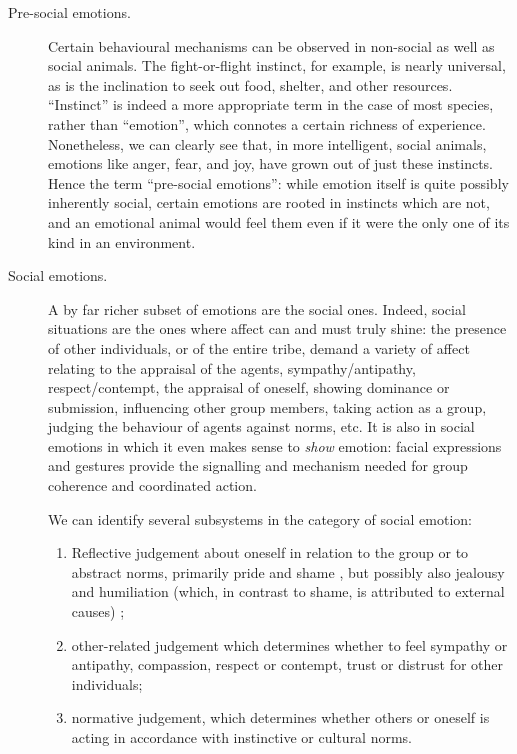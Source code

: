 \begin{description}
	\item[Pre-social emotions.] Certain behavioural mechanisms can be observed in non-social as well as social animals. The fight-or-flight instinct, for example, is nearly universal, as is the inclination to seek out food, shelter, and other resources. ``Instinct'' is indeed a more appropriate term in the case of most species, rather than ``emotion'', which connotes a certain richness of experience. Nonetheless, we can clearly see that, in more intelligent, social animals, emotions like anger, fear, and joy, have grown out of just these instincts. Hence the term ``pre-social emotions'': while emotion itself is quite possibly inherently social, certain emotions are rooted in instincts which are not, and an emotional animal would feel them even if it were the only one of its kind in an environment.
	
	\item[Social emotions.] A by far richer subset of emotions are the social ones. Indeed, social situations are the ones where affect can and must truly shine: the presence of other individuals, or of the entire tribe, demand a variety of affect relating to the appraisal of the agents, sympathy/antipathy, respect/contempt, the appraisal of oneself, showing dominance or submission, influencing other group members, taking action as a group, judging the behaviour of agents against norms, etc. It is also in social emotions in which it even makes sense to {\em show} emotion: facial expressions and gestures provide the signalling and mechanism needed for group coherence and coordinated action.
	
	We can identify several subsystems in the category of social emotion:
	
	\begin{enumerate}
		\item Reflective judgement about oneself in relation to the group or to abstract norms, primarily pride and shame \cite{Teroni2008}, but possibly also jealousy and humiliation (which, in contrast to shame, is attributed to external causes) \cite{fontaine2009};
		\item other-related judgement which determines whether to feel sympathy or antipathy, compassion, respect or contempt, trust or distrust for other individuals;
		\item normative judgement, which determines whether others or oneself is acting in accordance with instinctive or cultural norms.
	\end{enumerate}
	

\end{description}
